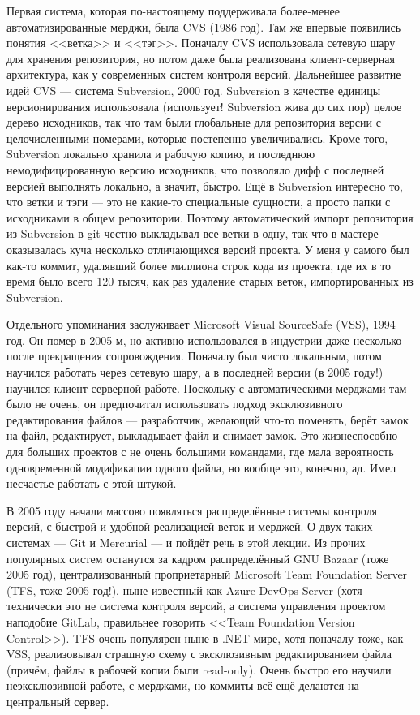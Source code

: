 \documentclass[a5paper]{article}
\begin{document}
Первая система, которая по-настоящему поддерживала более-менее автоматизированные мерджи, была CVS (1986 год). Там же впервые появились понятия <<ветка>> и <<тэг>>. Поначалу CVS использовала сетевую шару для хранения репозитория, но потом даже была реализована клиент-серверная архитектура, как у современных систем контроля версий. Дальнейшее развитие идей CVS --- система Subversion, 2000 год. Subversion в качестве единицы версионирования использовала (использует! Subversion жива до сих пор) целое дерево исходников, так что там были глобальные для репозитория версии с целочисленными номерами, которые постепенно увеличивались. Кроме того, Subversion локально хранила и рабочую копию, и последнюю немодифицированную версию исходников, что позволяло дифф с последней версией выполнять локально, а значит, быстро. Ещё в Subversion интересно то, что ветки и тэги --- это не какие-то специальные сущности, а просто папки с исходниками в общем репозитории. Поэтому автоматический импорт репозитория из Subversion в git честно выкладывал все ветки в одну, так что в мастере оказывалась куча несколько отличающихся версий проекта. У меня у самого был как-то коммит, удалявший более миллиона строк кода из проекта, где их в то время было всего 120 тысяч, как раз удаление старых веток, импортированных из Subversion.

Отдельного упоминания заслуживает Microsoft Visual SourceSafe (VSS), 1994 год. Он помер в 2005-м, но активно использовался в индустрии даже несколько после прекращения сопровождения. Поначалу был чисто локальным, потом научился работать через сетевую шару, а в последней версии (в 2005 году!) научился клиент-серверной работе. Поскольку с автоматическими мерджами там было не очень, он предпочитал использовать подход эксклюзивного редактирования файлов --- разработчик, желающий что-то поменять, берёт замок на файл, редактирует, выкладывает файл и снимает замок. Это жизнеспособно для больших проектов с не очень большими командами, где мала вероятность одновременной модификации одного файла, но вообще это, конечно, ад. Имел несчастье работать с этой штукой.

В 2005 году начали массово появляться распределённые системы контроля версий, с быстрой и удобной реализацией веток и мерджей. О двух таких системах --- Git и Mercurial --- и пойдёт речь в этой лекции. Из прочих популярных систем останутся за кадром распределённый GNU Bazaar (тоже 2005 год), централизованный проприетарный Microsoft Team Foundation Server (TFS, тоже 2005 год!), ныне известный как Azure DevOps Server (хотя технически это не система контроля версий, а система управления проектом наподобие GitLab, правильнее говорить <<Team Foundation Version Control>>). TFS очень популярен ныне в .NET-мире, хотя поначалу тоже, как VSS, реализовывал страшную схему с эксклюзивным редактированием файла (причём, файлы в рабочей копии были read-only). Очень быстро его научили неэксклюзивной работе, с мерджами, но коммиты всё ещё делаются на центральный сервер.
\end{document}
